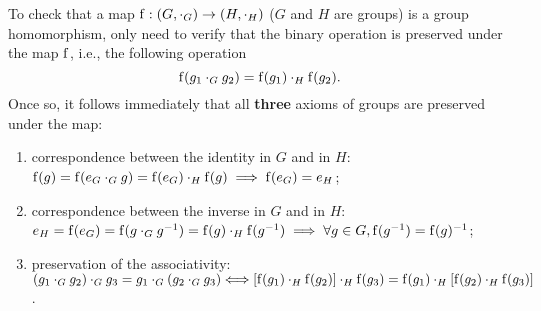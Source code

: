 \begin{remark}
To check that a map $\operatorname{f}: (G, \cdot_G) \to (H, \cdot_H)$ ($G$ and $H$ are groups) is a group homomorphism, only need to verify that the binary operation is preserved under the map $\operatorname{f}$, i.e., the following operation
$$\operatorname{f}(g_1 \cdot_G g_2) = \operatorname{f}(g_1) \cdot_H \operatorname{f}(g_2).$$
Once so, it follows immediately that all \textbf{three} axioms of groups are preserved under the map:
\begin{enumerate}
    \item correspondence between the identity in $G$ and in $H$: $\operatorname{f}(g) = \operatorname{f}(e_{G} \cdot_G g) = \operatorname{f}(e_{G}) \cdot_H \operatorname{f}(g) \implies \operatorname{f}(e_{G}) = e_{H}$;
    \item correspondence between the inverse in $G$ and in $H$: $e_{H} = \operatorname{f}(e_{G}) = \operatorname{f}(g \cdot_G g^{-1})= \operatorname{f}(g) \cdot_H \operatorname{f}(g^{-1}) \implies  \forall g \in G, \operatorname{f}(g^{-1}) = \operatorname{f}(g)^{-1}$; 
    \item preservation of the associativity: $(g_1 \cdot_G g_2) \cdot_G g_3 = g_1 \cdot_G (g_2 \cdot_G g_3)  \Longleftrightarrow [\operatorname{f}(g_1) \cdot_H  \operatorname{f}(g_2)] \cdot_H \operatorname{f}(g_3) =  \operatorname{f}(g_1) \cdot_H [\operatorname{f}(g_2) \cdot_H \operatorname{f}(g_3)]$.
\end{enumerate}
%
\end{remark}
%
